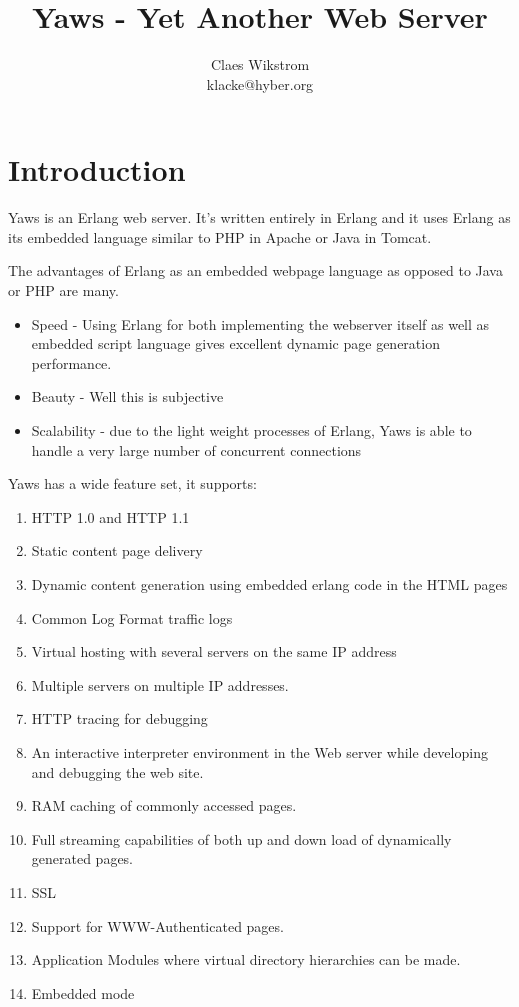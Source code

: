 \documentclass[11pt,oneside,english]{book}
\begin{document}
\title{Yaws - Yet Another Web Server}


\author{Claes Wikstrom\\
klacke@hyber.org}

\maketitle
\tableofcontents{}


\chapter{Introduction}

Yaws is an Erlang web server. It's written entirely in Erlang and it uses
Erlang as its embedded language similar to PHP in Apache or Java in Tomcat.

The advantages of Erlang as an embedded webpage language as opposed to
Java or PHP are many.
\begin{itemize}

\item{Speed - Using Erlang for both implementing the webserver itself as well
as embedded script language gives excellent dynamic page generation
performance.}

\item{Beauty - Well this is subjective}

\item{Scalability - due to the light weight processes of Erlang, Yaws
is able to handle a very large number of concurrent connections}

\end{itemize}

Yaws has a wide feature set, it supports:

\begin{enumerate}
\item HTTP 1.0 and HTTP 1.1 
\item Static content page delivery
\item Dynamic content generation using embedded erlang code in the
HTML pages
\item Common Log Format traffic logs
\item Virtual hosting with several servers on the same IP address
\item Multiple servers on multiple IP addresses.
\item HTTP tracing for debugging
\item An interactive interpreter environment in the Web server while
developing and debugging the web site.
\item RAM caching of commonly accessed pages.
\item Full streaming capabilities of both up and down load of dynamically
generated pages.
\item SSL 
\item Support for WWW-Authenticated pages.
\item Application Modules where virtual directory hierarchies can
be made.
\item Embedded mode
\end{enumerate}
\end{document}
